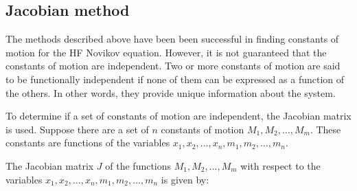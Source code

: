\documentclass[english,master]{liumaiex}
\theoremstyle{plain}
\theoremstyle{definition}
\begin{document}


\subsection*{Jacobian method}
The methods described above have been been successful in finding constants of motion for the HF Novikov equation. However, it is not guaranteed that the constants of motion are independent. Two or more constants of motion are said to be functionally independent if none of them can be expressed as a function of the others. In other words, they provide unique information about the system.

To determine if a set of constants of motion are independent, the Jacobian matrix is used. Suppose there are a set of $n$ constants of motion $M_1,M_2,\dots,M_m$. These constants are functions of the variables $x_1,x_2,\dots,x_n,m_1,m_2,\dots,m_n$.

The Jacobian matrix $J$ of the functions ${M_1,M_2,\dots,M_m}$ with respect to the variables ${x_1,x_2,\dots,x_n,m_1,m_2,\dots,m_n}$ is given by:
\end{document}

